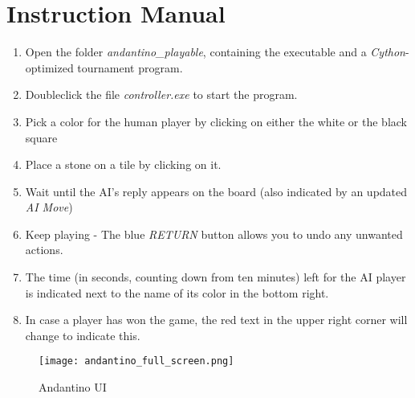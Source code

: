 \appendix
\section{Instruction Manual}


\begin{enumerate}
    \item Open the folder \textit{andantino\_playable}, containing the executable and a \textit{Cython}-optimized tournament program.
    \item Doubleclick the file \textit{controller.exe} to start the program.
    \item Pick a color for the  human player by clicking on either the white or the black square
    \item Place a stone on a tile by clicking on it.
    \item Wait until the AI's reply appears on the board (also indicated by an updated \textit{AI Move})
    \item Keep playing - The blue \textit{RETURN} button allows you to undo any unwanted actions.
    \item The time (in seconds, counting down from ten minutes) left for the AI player is indicated next to the name of its color in the bottom right.
    \item In case a player has won the game, the red text in the upper right corner will change to indicate this.

\end{enumerate}

\begin{figure}[H]
    \centering
    \texttt{[image: andantino\_full\_screen.png]}
    \caption{Andantino UI}
\end{figure}
